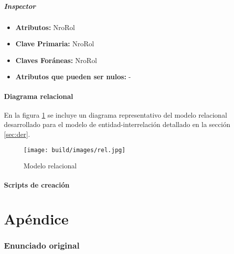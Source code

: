 \documentclass[a4paper,11pt]{article}
\begin{document}
\subsubsection{Inspector}

\begin{itemize}

	\item \textbf{Atributos:} NroRol
	
	\item \textbf{Clave Primaria:} NroRol
	
	\item \textbf{Claves Foráneas:} NroRol
	
	\item \textbf{Atributos que pueden ser nulos:} -
	
\end{itemize}

\subsection{Diagrama relacional}

 En la figura \ref{fig:relacional} se incluye un diagrama representativo del
 modelo relacional desarrollado para el modelo de entidad-interrelación
 detallado en la sección \ref{sec:der}.

\begin{figure}[h!t]
	\centering
	\texttt{[image: build/images/rel.jpg]}
	\caption{Modelo relacional} \label{fig:relacional}
\end{figure}

\FloatBarrier

\subsection{Scripts de creación}


%

\clearpage

\part{Apéndice}
\appendix

\section{Enunciado original}\label{sec:enunciado}

\end{document}
